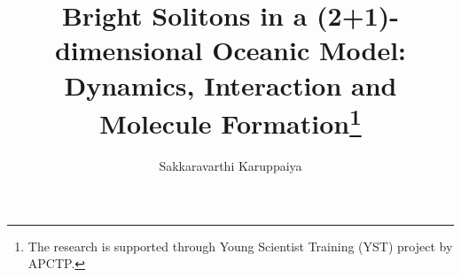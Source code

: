 \documentclass[12pt]{llncs}
\begin{document}
%

\fi

\title{Bright Solitons in a (2+1)-dimensional Oceanic Model: Dynamics, Interaction and Molecule Formation\thanks{The research is supported through Young Scientist Training (YST) project by APCTP.}}
\author{Sakkaravarthi Karuppaiya}

\maketitle
\end{document}
